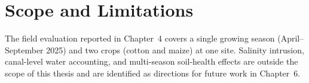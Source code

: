 \section{Scope and Limitations}
The field evaluation reported in Chapter~4 covers a single growing season (April--September
2025) and two crops (cotton and maize) at one site. Salinity intrusion, canal-level water
accounting, and multi-season soil-health effects are outside the scope of this thesis and are
identified as directions for future work in Chapter~6.
